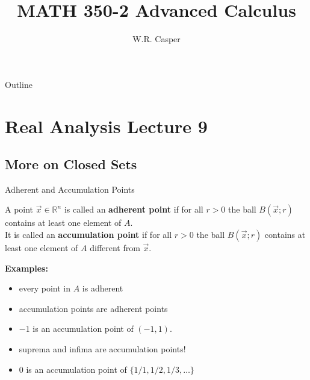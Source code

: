 \documentclass{beamer}
\title{MATH 350-2 Advanced Calculus}
\subtitle
{} %
\author[W.R. Casper] %
{W.R. Casper}
\institute[California State University Fullerton] %
{
  Department of Mathematics\\
  California State University Fullerton}
\begin{document}
\begin{frame}
  \titlepage
\end{frame}

\begin{frame}{Outline}
  \tableofcontents
\end{frame}



\section{Real Analysis Lecture 9}
\subsection{More on Closed Sets}

\begin{frame}{Adherent and Accumulation Points}
\begin{defn}
A point $\vec x\in \mathbb{R}^n$ is called an \textbf{adherent point} if for all $r > 0$ the ball $B(\vec x; r)$ contains at least one element of $A$.\\
\pause
It is called an \textbf{accumulation point} if for all $r > 0$ the ball $B(\vec x; r)$ contains at least one element of $A$ {\color{red} different from $\vec x$}.
\end{defn}
\pause
\textbf{Examples:}
\begin{itemize}
\pause
\item every point in $A$ is adherent
\pause
\item accumulation points are adherent points
\pause
\item $-1$ is an accumulation point of $(-1,1)$.
\pause
\item suprema and infima are accumulation points!
\pause
\item $0$ is an accumulation point of $\{1/1,1/2,1/3,\dots\}$
\end{itemize}
\end{frame}
\end{document}
